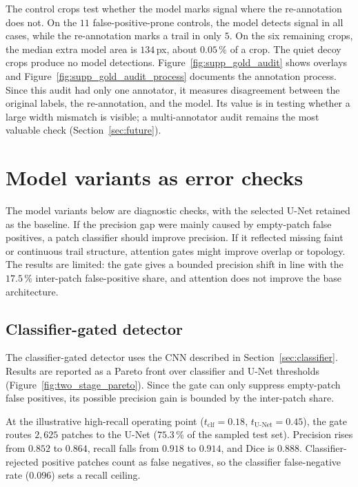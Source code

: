 \documentclass{cam-thesis}
\begin{document}
The control crops test whether the model marks signal where the re-annotation
does not. On the $11$ false-positive-prone controls, the model detects signal in
all cases, while the re-annotation marks a trail in only $5$. On the six
remaining crops, the median extra model area is $134$\,px, about $0.05\,\%$ of a
crop. The quiet decoy crops produce no model detections. Figure~\ref{fig:supp_gold_audit}
shows overlays and Figure~\ref{fig:supp_gold_audit_process} documents the
annotation process. Since this audit had only one annotator, it measures
disagreement between the original labels, the re-annotation, and the model. Its
value is in testing whether a large width mismatch is visible; a multi-annotator
audit remains the most valuable check (Section~\ref{sec:future}).

\section{Model variants as error checks}
\label{sec:ext_arch}

The model variants below are diagnostic checks, with the selected U-Net retained
as the baseline. If the precision gap were mainly caused by empty-patch false
positives, a patch classifier should improve precision. If it reflected missing
faint or continuous trail structure, attention gates might improve overlap or
topology. The results are limited: the gate gives a bounded precision shift in
line with the $17.5\,\%$ inter-patch false-positive share, and attention does not
improve the base architecture.

\subsection{Classifier-gated detector}
\label{sec:ext_twostage}

The classifier-gated detector uses the CNN described in Section~\ref{sec:classifier}.
Results are reported as a Pareto front over classifier and U-Net thresholds
(Figure~\ref{fig:two_stage_pareto}). Since the gate can only suppress
empty-patch false positives, its possible precision gain is bounded by the
inter-patch share.

At the illustrative high-recall operating point
($t_{\mathrm{clf}}=0.18$, $t_{\mathrm{U\mbox{-}Net}}=0.45$), the gate routes
$2{,}625$ patches to the U-Net ($75.3\,\%$ of the sampled test set). Precision
rises from $0.852$ to $0.864$, recall falls from $0.918$ to $0.914$, and Dice is
$0.888$. Classifier-rejected positive patches count as false negatives, so the
classifier false-negative rate ($0.096$) sets a recall ceiling.
\end{document}
